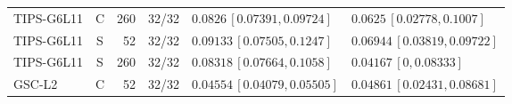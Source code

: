 \documentclass[10pt,a4paper]{article}
\begin{document}
\begin{longtable}{lcrcp{44mm}p{44mm}}
TIPS-G6L11 & C & 260 & 32/32 & \(0.0826\,[0.07391,0.09724]\) & \(0.0625\,[0.02778,0.1007]\)\\
TIPS-G6L11 & S & 52 & 32/32 & \(0.09133\,[0.07505,0.1247]\) & \(0.06944\,[0.03819,0.09722]\)\\
TIPS-G6L11 & S & 260 & 32/32 & \(0.08318\,[0.07664,0.1058]\) & \(0.04167\,[0,0.08333]\)\\
GSC-L2 & C & 52 & 32/32 & \(0.04554\,[0.04079,0.05505]\) & \(0.04861\,[0.02431,0.08681]\)\\

\end{longtable}
\end{document}
